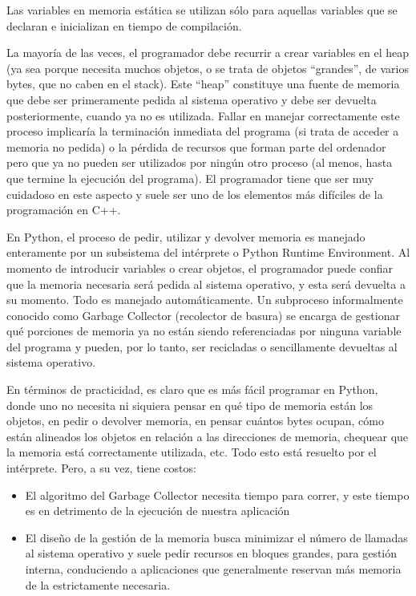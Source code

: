 Las variables en memoria estática se utilizan sólo para aquellas variables que
se declaran e inicializan en tiempo de compilación.

La mayoría de las veces, el programador debe recurrir a crear variables en el
heap (ya sea porque necesita muchos objetos, o se trata de objetos ``grandes'',
de varios bytes, que no caben en el stack). Este ``heap'' constituye una fuente
de memoria que debe ser primeramente pedida al sistema operativo y debe ser
devuelta posteriormente, cuando ya no es utilizada. Fallar en manejar
correctamente este proceso implicaría la terminación inmediata del programa (si
trata de acceder a memoria no pedida) o la pérdida de recursos que forman parte
del ordenador pero que ya no pueden ser utilizados por ningún otro proceso (al
menos, hasta que termine la ejecución del programa). El programador tiene que
ser muy cuidadoso en este aspecto y suele ser uno de los elementos más
difíciles de la programación en C++.

En Python, el proceso de pedir, utilizar y devolver memoria es manejado
enteramente por un subsistema del intérprete o Python Runtime Environment. Al
momento de introducir variables o crear objetos, el programador puede confiar
que la memoria necesaria será pedida al sistema operativo, y esta será devuelta
a su momento. Todo es manejado automáticamente. Un subproceso informalmente
conocido como Garbage Collector (recolector de basura) se encarga de gestionar
qué porciones de memoria ya no están siendo referenciadas por ninguna variable
del programa y pueden, por lo tanto, ser recicladas o sencillamente devueltas
al sistema operativo.

En términos de practicidad, es claro que es más fácil programar en Python,
donde uno no necesita ni siquiera pensar en qué tipo de memoria están los
objetos, en pedir o devolver memoria, en pensar cuántos bytes ocupan, cómo
están alineados los objetos en relación a las direcciones de memoria, chequear
que la memoria está correctamente utilizada, etc. Todo esto está resuelto por
el intérprete. Pero, a su vez, tiene costos:

\begin{itemize}
    \item El algoritmo del Garbage Collector necesita tiempo para correr, y
este tiempo es en detrimento de la ejecución de nuestra aplicación

    \item El diseño de la gestión de la memoria busca minimizar el número de
llamadas al sistema operativo y suele pedir recursos en bloques grandes, para
gestión interna, conduciendo a aplicaciones que generalmente reservan más
memoria de la estrictamente necesaria.
\end{itemize}


